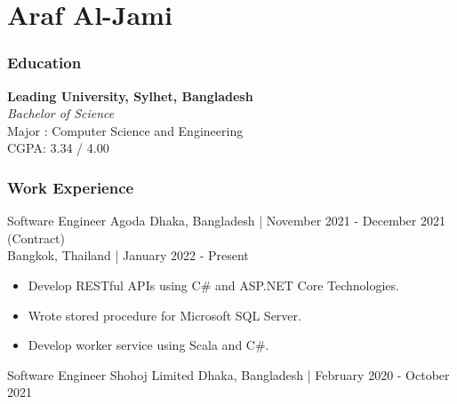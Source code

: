 \documentclass{resumestyle}
\begin{document}
\large%

\part{Araf Al-Jami}

\section{Education}%

\textbf{Leading University, Sylhet, Bangladesh}\\%
\textit{Bachelor of Science}\\%
Major : Computer Science and Engineering\\%
CGPA: 3.34 / 4.00%

\section{Work Experience}%
    \worksubsection%
        {Software Engineer}%
        {Agoda}%
        {Dhaka, Bangladesh | November 2021 - December 2021 (Contract)}\\%
        {Bangkok, Thailand | January 2022 - Present}%
    
    \begin{itemize}[labelsep=4pt,leftmargin=*,topsep=5pt,partopsep=0pt,itemsep=1pt]%
        \item Develop RESTful APIs using C\# and ASP.NET Core Technologies.%
        \item Wrote stored procedure for Microsoft SQL Server.%
        \item Develop worker service using Scala and C\#.%
    \end{itemize}%

    \vspace{4pt}%

    \worksubsection%
        {Software Engineer}%
        {Shohoj Limited}%
        {Dhaka, Bangladesh | February 2020 - October 2021}%
    
\end{document}
